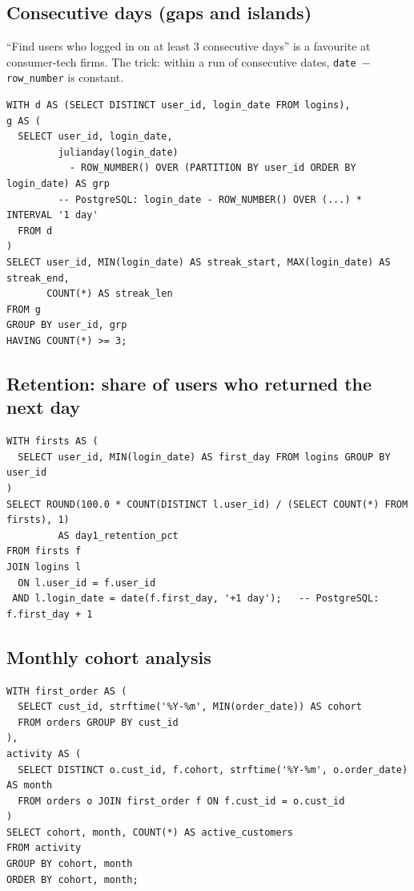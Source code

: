 \subsection{Consecutive days (gaps and islands)}
\begin{realworld}
``Find users who logged in on at least 3 consecutive days'' is a favourite at consumer-tech firms. The trick: within a run of consecutive dates, \texttt{date $-$ row\_number} is constant.
\end{realworld}
\begin{lstlisting}[style=sql]
WITH d AS (SELECT DISTINCT user_id, login_date FROM logins),
g AS (
  SELECT user_id, login_date,
         julianday(login_date)
           - ROW_NUMBER() OVER (PARTITION BY user_id ORDER BY login_date) AS grp
         -- PostgreSQL: login_date - ROW_NUMBER() OVER (...) * INTERVAL '1 day'
  FROM d
)
SELECT user_id, MIN(login_date) AS streak_start, MAX(login_date) AS streak_end,
       COUNT(*) AS streak_len
FROM g
GROUP BY user_id, grp
HAVING COUNT(*) >= 3;
\end{lstlisting}

\subsection{Retention: share of users who returned the next day}
\begin{lstlisting}[style=sql]
WITH firsts AS (
  SELECT user_id, MIN(login_date) AS first_day FROM logins GROUP BY user_id
)
SELECT ROUND(100.0 * COUNT(DISTINCT l.user_id) / (SELECT COUNT(*) FROM firsts), 1)
         AS day1_retention_pct
FROM firsts f
JOIN logins l
  ON l.user_id = f.user_id
 AND l.login_date = date(f.first_day, '+1 day');   -- PostgreSQL: f.first_day + 1
\end{lstlisting}

\subsection{Monthly cohort analysis}
\begin{lstlisting}[style=sql]
WITH first_order AS (
  SELECT cust_id, strftime('%Y-%m', MIN(order_date)) AS cohort
  FROM orders GROUP BY cust_id
),
activity AS (
  SELECT DISTINCT o.cust_id, f.cohort, strftime('%Y-%m', o.order_date) AS month
  FROM orders o JOIN first_order f ON f.cust_id = o.cust_id
)
SELECT cohort, month, COUNT(*) AS active_customers
FROM activity
GROUP BY cohort, month
ORDER BY cohort, month;
\end{lstlisting}

